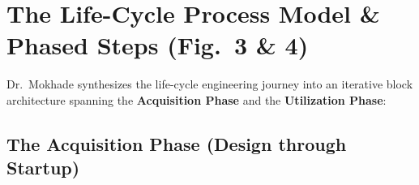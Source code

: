 \section{The Life-Cycle Process Model \& Phased Steps (Fig.~3 \& 4)}
\label{sec:phased_steps}

Dr.~Mokhade synthesizes the life-cycle engineering journey into an iterative block architecture spanning the \textbf{Acquisition Phase} and the \textbf{Utilization Phase}:

\subsection{The Acquisition Phase (Design through Startup)}
